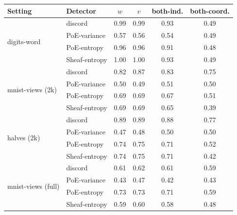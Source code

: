 \small
\begin{tabular}{llcccc}
\toprule
Setting & Detector & $w$ & $v$ & both-ind. & both-coord. \\
\midrule
\multirow{4}{*}{digits-word} & discord & 0.99 & 0.99 & 0.93 & 0.49 \\
 & PoE-variance & 0.57 & 0.56 & 0.54 & 0.49 \\
 & PoE-entropy & 0.96 & 0.96 & 0.91 & 0.48 \\
 & Sheaf-entropy & 1.00 & 1.00 & 0.93 & 0.49 \\
\midrule
\multirow{4}{*}{mnist-views (2k)} & discord & 0.82 & 0.87 & 0.83 & 0.75 \\
 & PoE-variance & 0.50 & 0.49 & 0.51 & 0.50 \\
 & PoE-entropy & 0.69 & 0.69 & 0.67 & 0.51 \\
 & Sheaf-entropy & 0.69 & 0.69 & 0.65 & 0.39 \\
\midrule
\multirow{4}{*}{halves (2k)} & discord & 0.89 & 0.89 & 0.88 & 0.77 \\
 & PoE-variance & 0.47 & 0.48 & 0.50 & 0.50 \\
 & PoE-entropy & 0.74 & 0.75 & 0.71 & 0.52 \\
 & Sheaf-entropy & 0.74 & 0.75 & 0.71 & 0.42 \\
\midrule
\multirow{4}{*}{mnist-views (full)} & discord & 0.61 & 0.62 & 0.61 & 0.59 \\
 & PoE-variance & 0.43 & 0.47 & 0.42 & 0.43 \\
 & PoE-entropy & 0.73 & 0.73 & 0.71 & 0.59 \\
 & Sheaf-entropy & 0.59 & 0.60 & 0.58 & 0.48 \\
\bottomrule
\end{tabular}
